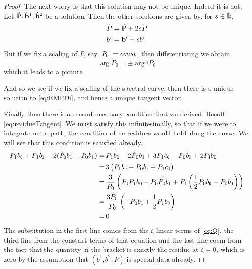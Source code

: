 \begin{lem}
\begin{proof}
The next worry is that this solution may not be unique. Indeed it is not. Let $\dot {\bf P}, \dot {\bf b}^1, \dot {\bf b}^2$ be a solution. Then the other solutions are given by, for $s\in \mathbb{R}$,
\begin{align*}
\dot P &= \dot {\bf P} + 2sP \\
\dot b^i &= \dot {\bf b}^i + sb^i \\
\end{align*}
But if we fix a scaling of $P$, say $\left|P_0\right| = const$, then differentiating we obtain
\[
\arg \dot P_0 = \pm \arg i P_0
\]
which it leads to a picture

\begin{center}
\end{center}

And so we see if we fix a scaling of the spectral curve, then there is a unique solution to \eqref{eq:EMPDi}, and hence a unique tangent vector.

Finally then there is a second necessary condition that we derived. Recall \eqref{eq:residueTangent}. We must satisfy this infinitesimally, so that if we were to integrate out a path, the condition of no-residues would hold along the curve. We will see that this condition is satisfied already.
\begin{align*}
\dot{P}_1 b_0 + P_1 \dot{b}_0 - 2(\dot{P}_0 b_1 + P_0 \dot{b}_1)
&= P_1\dot{b}_0 - 2\dot{P}_0b_1 + 3P_1\hat{c}_0 - P_0\dot{b}_1 + 2P_1\dot{b}_0 \\
&= 3\left( P_1\dot{b}_0 - \dot{P}_0b_1 + P_1\hat{c}_0\right) \\
&= \frac{3}{P_0}\left( P_0P_1\dot{b}_0 - P_0\dot{P}_0b_1 + P_1\left( \frac{1}{2}\dot{P_0}b_0 - P_0\dot{b_0} \right)\right) \\
&= \frac{3\dot{P}_0}{P_0}\left( - P_0b_1 + \frac{1}{2}P_1b_0 \right)\\
&= 0
\end{align*}
The substitution in the first line comes from the $ζ$ linear terms of \eqref{eq:Q}, the third line from the constant terms of that equation and the last line coem from the fact that the quantity in the bracket is exactly the residue at $ζ=0$, which is zero by the assumption that $(b^1,b^2,P)$ is spectal data already.

\end{proof}
\end{lem}


